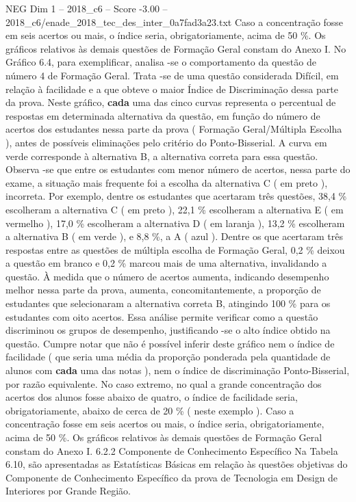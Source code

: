\begin{textsample}{NEG Dim 1 – 2018\_c6 – Score -3.00 – 2018\_c6/enade\_2018\_tec\_des\_inter\_0a7fad3a23.txt}
Caso a concentração fosse em seis acertos ou mais, o índice seria, obrigatoriamente, acima de 50 \%.
Os gráficos relativos às demais questões de Formação Geral constam do Anexo I.
No Gráfico 6.4, para exemplificar, analisa -se o comportamento da questão de número 4 de Formação Geral.
Trata -se de uma questão considerada Difícil, em relação à facilidade e a que obteve o maior Índice de Discriminação dessa parte da prova.
Neste gráfico, \textbf{cada} uma das cinco curvas representa o percentual de respostas em determinada alternativa da questão, em função do número de acertos dos estudantes nessa parte da prova ( Formação Geral/Múltipla Escolha ), antes de possíveis eliminações pelo critério do Ponto-Bisserial.
A curva em verde corresponde à alternativa B, a alternativa correta para essa questão.
Observa -se que entre os estudantes com menor número de acertos, nessa parte do exame, a situação mais frequente foi a escolha da alternativa C ( em preto ), incorreta.
Por exemplo, dentre os estudantes que acertaram três questões, 38,4 \% escolheram a alternativa C ( em preto ), 22,1 \% escolheram a alternativa E ( em vermelho ), 17,0 \% escolheram a alternativa D ( em laranja ), 13,2 \% escolheram a alternativa B ( em verde ), e 8,8 \%, a A ( azul ).
Dentre os que acertaram três respostas entre as questões de múltipla escolha de Formação Geral, 0,2 \% deixou a questão em branco e 0,2 \% marcou mais de uma alternativa, invalidando a questão.
À medida que o número de acertos aumenta, indicando desempenho melhor nessa parte da prova, aumenta, concomitantemente, a proporção de estudantes que selecionaram a alternativa correta B, atingindo 100 \% para os estudantes com oito acertos.
Essa análise permite verificar como a questão discriminou os grupos de desempenho, justificando -se o alto índice obtido na questão.
Cumpre notar que não é possível inferir deste gráfico nem o índice de facilidade ( que seria uma média da proporção ponderada pela quantidade de alunos com \textbf{cada} uma das notas ), nem o índice de discriminação Ponto-Bisserial, por razão equivalente.
No caso extremo, no qual a grande concentração dos acertos dos alunos fosse abaixo de quatro, o índice de facilidade seria, obrigatoriamente, abaixo de cerca de 20 \% ( neste exemplo ).
Caso a concentração fosse em seis acertos ou mais, o índice seria, obrigatoriamente, acima de 50 \%.
Os gráficos relativos às demais questões de Formação Geral constam do Anexo I. 6.2.2 Componente de Conhecimento Específico Na Tabela 6.10, são apresentadas as Estatísticas Básicas em relação às questões objetivas do Componente de Conhecimento Específico da prova de Tecnologia em Design de Interiores por Grande Região.

\end{textsample}
